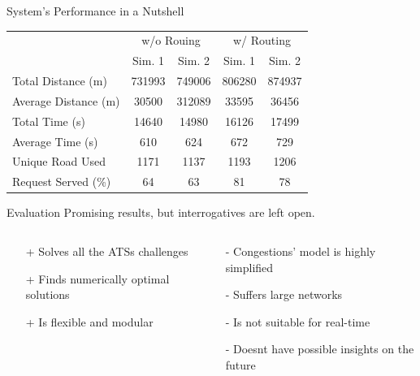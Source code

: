 \begin{frame}{System's Performance in a Nutshell}

			\begin{table}[h]
				\centering
				\begin{tabular}{ |p{3.7cm}|c|c|c|c|}
					\cline{2-5}
					\multicolumn{1}{c}{}&\multicolumn{2}{|c|}{w/o Rouing} &\multicolumn{2}{|c|}{w/ Routing}\\
					\cline{2-5}
					\multicolumn{1}{c|}{}& Sim. 1 & Sim. 2 & Sim. 1 & Sim. 2\\
					\hline
					Total Distance (m) &731993& 749006& 806280&874937\\
					Average Distance (m) &30500 & 312089 &33595&36456\\
					Total Time (s) &14640& 14980 &16126&17499\\
					Average Time (s) & 610& 624 &672&729\\
					Unique Road Used &1171&1137 &1193&1206\\
					Request Served (\%)&64 & 63 &81&78\\
				\end{tabular}
			\end{table}
\end{frame}
\begin{frame}{Evaluation}
	\hspace{0.5cm} Promising results, but interrogatives are left open. 
	\vspace{0.5cm}
	\begin{columns}
		\begin{column}{0.35\textwidth}
			\begin{itemize}
				\item[+] Solves all the ATSs challenges
				\item[+] Finds numerically optimal solutions
				\item[+] Is flexible and modular
			\end{itemize}
		\end{column}
		\vline
		\hspace{0.8cm}
		\begin{column}{0.4\textwidth}
			\begin{itemize}
				\item[-] Congestions' model is highly simplified
				\item[-] Suffers large networks
				\item[-] Is not suitable for real-time 
				\item[-] Doesnt have possible insights on the future
			\end{itemize}
		\end{column}
	\end{columns}
\end{frame}